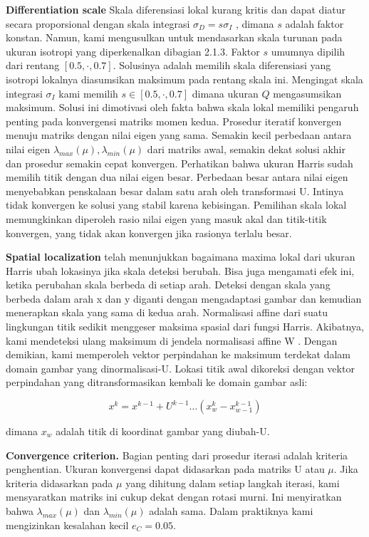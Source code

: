 \textbf{Differentiation scale} Skala diferensiasi lokal kurang kritis dan dapat diatur secara proporsional dengan skala 
integrasi \(\sigma_{D} = s \sigma_{I}\) , dimana \(s\) adalah faktor konstan. Namun, kami mengusulkan untuk mendasarkan skala 
turunan pada ukuran isotropi yang diperkenalkan dibagian 2.1.3. Faktor \(s\) umumnya dipilih dari rentang \([0.5, \cdot , 0.7]\). 
Solusinya adalah memilih skala diferensiasi yang isotropi lokalnya diasumsikan maksimum pada rentang skala ini. 
Mengingat skala integrasi \(\sigma_{I}\) kami memilih \(s \in [0.5,\cdot,0.7]\) dimana ukuran \(Q\) mengasumsikan maksimum. 
Solusi ini dimotivasi oleh fakta bahwa skala lokal memiliki pengaruh penting pada konvergensi matriks momen kedua. 
Prosedur iteratif konvergen menuju matriks dengan nilai eigen yang sama. Semakin kecil perbedaan antara nilai eigen \(\lambda_{max}(\mu),\lambda_{min}(\mu)\) 
dari matriks awal, semakin dekat solusi akhir dan prosedur semakin cepat konvergen. Perhatikan bahwa ukuran Harris sudah memilih titik dengan dua nilai eigen 
besar. Perbedaan besar antara nilai eigen menyebabkan penskalaan besar dalam satu arah oleh transformasi U. 
Intinya tidak konvergen ke solusi yang stabil karena kebisingan. Pemilihan skala lokal memungkinkan diperoleh 
rasio nilai eigen yang masuk akal dan titik-titik konvergen, yang tidak akan konvergen jika rasionya terlalu besar.

\textbf{Spatial localization} telah menunjukkan bagaimana maxima lokal dari ukuran Harris ubah lokasinya jika skala deteksi berubah. 
Bisa juga mengamati efek ini, ketika perubahan skala berbeda di setiap arah. Deteksi dengan skala yang berbeda dalam arah x dan y diganti dengan mengadaptasi gambar dan kemudian menerapkan skala yang sama di kedua arah. Normalisasi affine dari suatu lingkungan titik sedikit menggeser maksima spasial dari fungsi Harris. Akibatnya, kami mendeteksi ulang maksimum di jendela normalisasi affine W . Dengan demikian, kami memperoleh vektor perpindahan ke maksimum terdekat dalam domain gambar yang dinormalisasi-U. Lokasi titik awal dikoreksi 
dengan vektor perpindahan yang ditransformasikan kembali ke domain gambar asli:

\begin{equation*}
  x^{k} = x^{k-1} + U^{k-1} \dots (x_{w}^{k} - x_{w-1}^{k-1})
\end{equation*}

dimana \(x_{w}\) adalah titik di koordinat gambar yang diubah-U.

\textbf{Convergence criterion.} Bagian penting dari prosedur iterasi adalah kriteria penghentian. 
Ukuran konvergensi dapat didasarkan pada matriks U atau \(\mu\). Jika kriteria didasarkan pada \(\mu\) yang 
dihitung dalam setiap langkah iterasi, kami mensyaratkan matriks ini cukup dekat dengan rotasi murni. 
Ini menyiratkan bahwa \(\lambda_{max}(\mu)\) dan \(\lambda_{min}(\mu)\) adalah sama. 
Dalam praktiknya kami mengizinkan kesalahan kecil \(e_{C}=0.05\).

